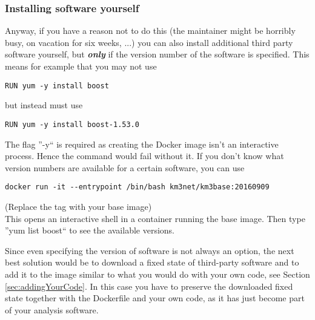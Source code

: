 \documentclass[a4paper, twoside, 11pt]{article}
\begin{document}
\subsubsection{Installing software yourself}
Anyway, if you have a reason not to do this (the maintainer might be horribly busy, on vacation for six weeks, ...) 
you can also install additional third party software yourself, 
but \textbf{\textit{only}} if the version number of the software is specified. 
This means for example that you may not use 
\begin{lstlisting}[basicstyle=\footnotesize\ttfamily,frame=single]
RUN yum -y install boost 
\end{lstlisting}
but instead must use 
\begin{lstlisting}[basicstyle=\footnotesize\ttfamily,frame=single]
RUN yum -y install boost-1.53.0
\end{lstlisting}
The flag ''-y`` is required as creating the Docker image isn't an interactive process. 
Hence the command would fail without it. 
If you don't know what version numbers are available for a certain software, you can use 
\begin{lstlisting}[basicstyle=\footnotesize\ttfamily,frame=single]
docker run -it --entrypoint /bin/bash km3net/km3base:20160909
\end{lstlisting}
(Replace the tag with your base image) \\
This opens an interactive shell in a container running the base image. 
Then type ''yum list boost`` to see the available versions. 

Since even specifying the version of software is not always an option, 
the next best solution would be to download a fixed state of third-party software 
and to add it to the image similar to what you would do with your own code, 
see Section \ref{sec:addingYourCode}. 
In this case you have to preserve the downloaded fixed state together with the Dockerfile and your own code, 
as it has just become part of your analysis software. 
\end{document}
